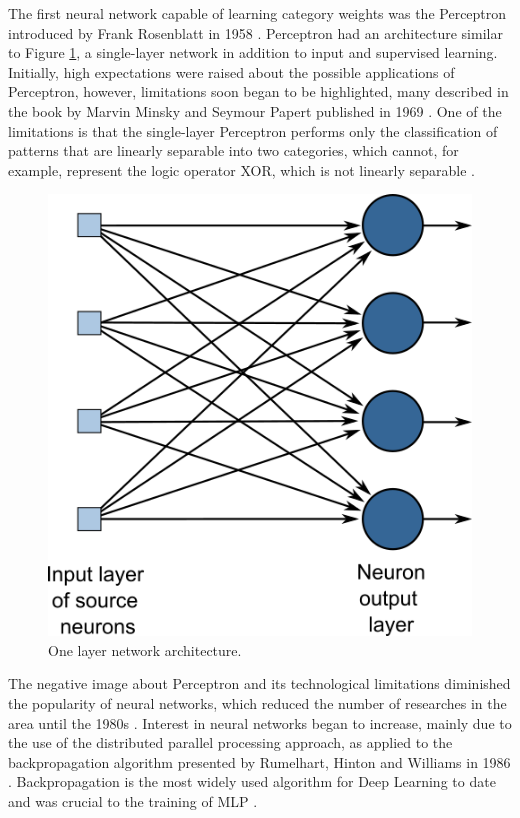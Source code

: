 The first neural network capable of learning category weights was the Perceptron introduced by Frank Rosenblatt in 1958 \cite{haykin1999}. Perceptron had an architecture similar to Figure \ref{fig:figure106}, a single-layer network in addition to input and supervised learning. Initially, high expectations were raised about the possible applications of Perceptron, however, limitations soon began to be highlighted, many described in the book by Marvin Minsky and Seymour Papert published in 1969 \cite{minsky1969perceptrons}. One of the limitations is that the single-layer Perceptron performs only the classification of patterns that are linearly separable into two categories, which cannot, for example, represent the logic operator XOR, which is not linearly separable \cite{haykin1999}.


\begin{figure}
    \centering
    \includegraphics[scale=0.65]{"Part 3 - Learning Systems/Supervised Learning/Deep Learning/images/figure106.png"}
    \caption{One layer network architecture.}
    \label{fig:figure106}
\end{figure}

The negative image about Perceptron and its technological limitations diminished the popularity of neural networks, which reduced the number of researches in the area until the 1980s \cite{goodfellow2016}. Interest in neural networks began to increase, mainly due to the use of the distributed parallel processing approach, as applied to the backpropagation algorithm presented by Rumelhart, Hinton and Williams in 1986 \cite{rumelhart1986learning}. Backpropagation is the most widely used algorithm for Deep Learning  to date and was crucial to the training of MLP \cite{haykin1999}.

